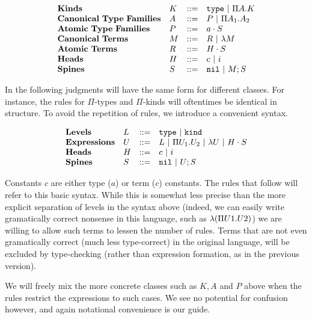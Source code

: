 $$
\begin{array}{llll}
\mathbf{Kinds} & K & ::= & \mathtt{type} \ |\  \Pi A.K \\
\mathbf{Canonical\ Type\ Families} & A & ::= & P \ |\  \Pi A_1.A_2 \\
\mathbf{Atomic\ Type\ Families} & P & ::= & a\cdot S \\
\mathbf{Canonical\ Terms} & M & ::= & R \ |\  \lambda M \\
\mathbf{Atomic\ Terms} & R & ::= & H\cdot S \\
\mathbf{Heads} & H & ::= & c \ |\  i\\
\mathbf{Spines} & S & ::= & \mathtt{nil} \ |\  M;S\\
\end{array} 
$$

In the following judgments will have the same
form for different classes.  For instance,
the rules for $\Pi$-types and $\Pi$-kinds will
oftentimes be identical in structure.  To avoid the
repetition of rules, we introduce a convenient 
syntax.

$$
\begin{array}{llll}
\mathbf{Levels} & L & ::= & \mathtt{type} \ |\  \mathtt{kind} \\
\mathbf{Expressions} & U & ::= & L \ |\  \Pi U_1.U_2 \ |\  \lambda U \ |\  H\cdot S \\
\mathbf{Heads} & H & ::= & c \ |\  i\\
\mathbf{Spines} & S & ::= & \mathtt{nil} \ |\  U;S\\
\end{array} 
$$

Constants $c$ are either type ($a$) or term ($c$) constants.
The rules that follow will refer to this basic syntax.  While this
is somewhat less precise than the more explicit separation of 
levels in the syntax above (indeed, we can easily write gramatically
correct nonsense in this language, such as $\lambda (\Pi U1.U2)$)
we are willing to allow such terms to lessen the number of rules.
Terms that are not even gramatically correct (much less type-correct) 
in the original language, will be excluded by type-checking (rather than expression 
formation, as in the previous version).

We will freely mix the more concrete classes such as $K,A$ and $P$
above when the rules restrict the expressions to such cases.
We see no potential for confusion however, and again notational
convenience is our guide.  


